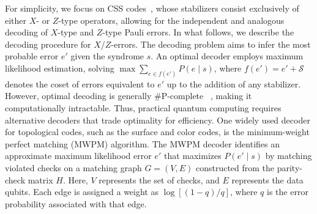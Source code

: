 \documentclass[%
 reprint,
 amsmath,amssymb,
 aps,
]{revtex4-2}
\begin{document}

For simplicity, we focus on CSS codes~\cite{calderbank1996good, steane1996multiple}, whose stabilizers consist exclusively of either $X$- or $Z$-type operators, allowing for the independent and analogous decoding of $X$-type and $Z$-type Pauli errors. In what follows, we describe the decoding procedure for $X$/$Z$-errors.
The decoding problem aims to infer the most probable error $e'$ given the syndrome $s$. An optimal decoder employs maximum likelihood estimation, solving $\max \sum_{e\in f(e')} P(e \mid s)$, where $f(e') = e' + \mathcal{S}$ denotes the coset of errors equivalent to $e'$ up to the addition of any stabilizer. However, optimal decoding is generally \#P-complete
~\cite{iyer2015hardness}, making it computationally intractable. Thus, practical quantum computing requires alternative decoders that trade optimality for efficiency. One widely used decoder for topological codes, such as the surface and color codes, is the minimum-weight perfect matching (MWPM) algorithm. The MWPM decoder identifies an approximate maximum likelihood error $e'$ that maximizes $P(e' \mid s)$ by matching violated checks on a matching graph $G = (V, E)$ constructed from the parity-check matrix $H$. Here, $V$ represents the set of checks, and $E$ represents the data qubits. Each edge is assigned a weight as $\log[(1 - q)/q]$, where $q$ is the error probability associated with that edge. 
\end{document}
